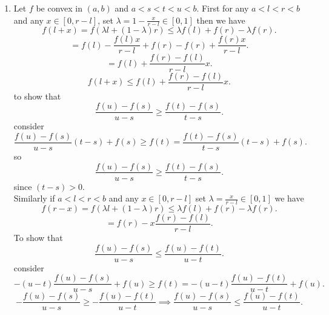 \documentclass[11pt]{article}
\begin{document}
{\begin{enumerate}
        \item Let $f$ be convex in $(a,b)$ and $a < s < t < u < b$.
            First for any $a < l < r < b$ and any  $x \in [0, r-l]$, set $\lambda = 1 - \frac{x}{r-l} \in [0,1]$ then we have
            \[
            f(l + x) = f(\lambda l + (1-\lambda) r) \le \lambda f(l) + f(r) - \lambda f(r)
            .\] 
            \[
            = f(l) - \frac{f(l)x}{r-l} + f(r) - f(r) + \frac{f(r)x}{r-l}
            .\] 
            \[
            = f(l) + \frac{f(r)-f(l)}{r-l}x
            .\] 
            \[
            f(l + x) \le f(l) + \frac{f(r) - f(l)}{r-l}x
            .\] 
            to show that
            \[
                \frac{f(u) - f(s)}{u-s} \ge \frac{f(t)-f(s)}{t-s}
            .\] 
            consider
            \[
                \frac{f(u)-f(s)}{u-s}(t-s) + f(s) \ge f(t) = \frac{f(t)-f(s)}{t-s}(t-s) + f(s)
            .\] 
            so
            \[
                \frac{f(u)-f(s)}{u-s} \ge \frac{f(t)-f(s)}{t-s}
            .\] 
            since $(t-s) > 0$.\\
            Similarly if $a < l < r < b$ and any $x \in [0,r-l]$ set $\lambda = \frac{x}{r-l} \in [0,1]$ we have
            \[
            f(r - x) = f(\lambda l + (1-\lambda)r) \le \lambda f(l) + f(r) - \lambda f(r)
            .\] 
            \[
            = f(r) - x \frac{f(r) - f(l)}{r -l}
            .\] 
            To show that
            \[
                \frac{f(u) - f(s)}{u-s} \le \frac{f(u)-f(t)}{u-t}
            .\] 
            consider
            \[
            -(u-t)\frac{f(u)-f(s)}{u-s} + f(u) \ge f(t) = -(u-t)\frac{f(u)-f(t)}{u-t} + f(u)
            .\] 
            \[
            - \frac{f(u)-f(s)}{u-s} \ge - \frac{f(u)-f(t)}{u-t} \implies \frac{f(u)-f(s)}{u-s} \le  \frac{f(u)-f(t)}{u-t}
            .\] 
    \end{enumerate}
}
\end{document}
